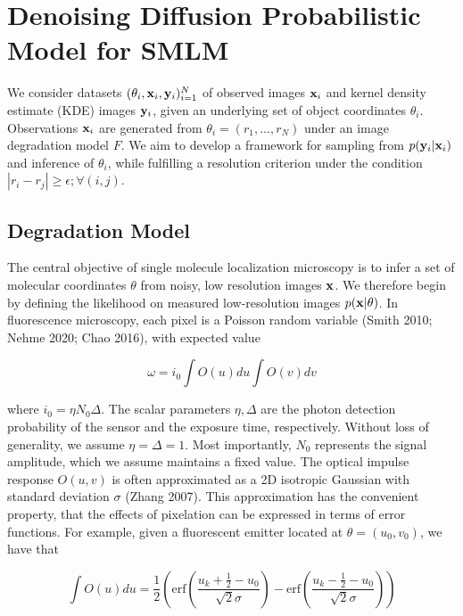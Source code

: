 \documentclass{article}
\begin{document}
\section{Denoising Diffusion Probabilistic Model for SMLM}

We consider datasets $(\theta_{i}, \bold{x}_i,\bold{y}_i)_{i=1}^{N}$ of observed images $\bold{x}_i$ and kernel density estimate (KDE) images $\bold{y}_{i}$, given an underlying set of object coordinates $\theta_{i}$. Observations $\bold{x}_i$ are generated from $\theta_{i}=(r_{1},...,r_{N})$ under an image degradation model $F$. We aim to develop a framework for sampling from $p(\bold{y}_{i}|\bold{x}_{i})$ and inference of $\theta_{i}$, while fulfilling a resolution criterion under the condition $|r_{i}-r_{j}| \geq \epsilon ; \forall (i,j)$. 

\subsection{Degradation Model}

The central objective of single molecule localization microscopy is to infer a set of molecular coordinates $\theta$ from noisy, low resolution images $\bold{x}$. We therefore begin by defining the likelihood on measured low-resolution images $p(\bold{x}|\theta)$. In fluorescence microscopy, each pixel is a Poisson random variable (Smith 2010; Nehme 2020; Chao 2016), with expected value

\begin{equation}
\omega = i_{0}\int O(u)du\int O(v)dv
\end{equation}

where $i_{0} = \eta N_{0}\Delta$. The scalar parameters $\eta,\Delta$ are the photon detection probability of the sensor and the exposure time, respectively. Without loss of generality, we assume $\eta = \Delta = 1$. Most importantly, $N_{0}$ represents the signal amplitude, which we assume maintains a fixed value. The optical impulse response $O(u,v)$ is often approximated as a 2D isotropic Gaussian with standard deviation $\sigma$ (Zhang 2007). This approximation has the convenient property, that the effects of pixelation can be expressed in terms of error functions. For example, given a fluorescent emitter located at $\theta = (u_{0},v_{0})$, we have that

\begin{equation}
\int O(u)du = \frac{1}{2}\left(\mathrm{erf}\left(\frac{u_{k}+\frac{1}{2}-u_{0}}{\sqrt{2}\sigma}\right) -\mathrm{erf}\left(\frac{u_{k}-\frac{1}{2}-u_{0}}{\sqrt{2}\sigma}\right)\right)
\end{equation}
\end{document}
